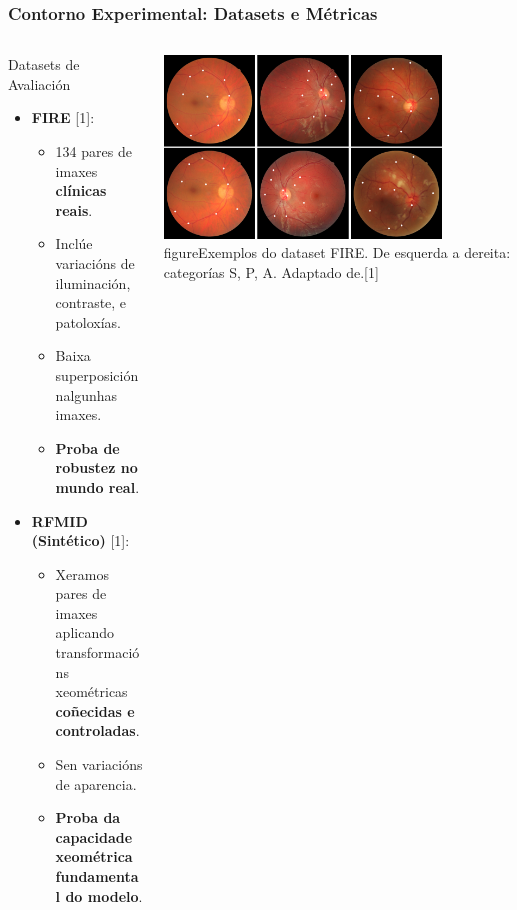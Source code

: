 \documentclass[xcolor=dvipsnames]{beamer}
\begin{document}
\begin{frame}
    \frametitle{Contorno Experimental: Datasets e Métricas}
    
    \begin{columns}
        \begin{column}{0.5\textwidth}
            \begin{block}{Datasets de Avaliación}
                \begin{itemize}
                    \item \textbf{FIRE} [1]:
                    \begin{itemize}
                        \item 134 pares de imaxes \textbf{clínicas reais}.
                        \item Inclúe variacións de iluminación, contraste, e patoloxías.
                        \item Baixa superposición nalgunhas imaxes.
                        \item \textbf{Proba de robustez no mundo real}.
                    \end{itemize}
                    \vspace{0.3cm}
                    \item \textbf{RFMID (Sintético)} [1]:
                    \begin{itemize}
                        \item Xeramos pares de imaxes aplicando transformacións xeométricas \textbf{coñecidas e controladas}.
                        \item Sen variacións de aparencia.
                        \item \textbf{Proba da capacidade xeométrica fundamental do modelo}.
                    \end{itemize}
                \end{itemize}
            \end{block}
        \end{column}
        
        \begin{column}{0.5\textwidth}
            \centering
            \includegraphics[width=0.8\textwidth]{../imaxes/fire-ej.png}
            \small{figure}{Exemplos do dataset FIRE. De esquerda a dereita: categorías S, P, A. Adaptado de.[1]}
        \end{column}
    \end{columns}
    

\end{frame}
\end{document}
